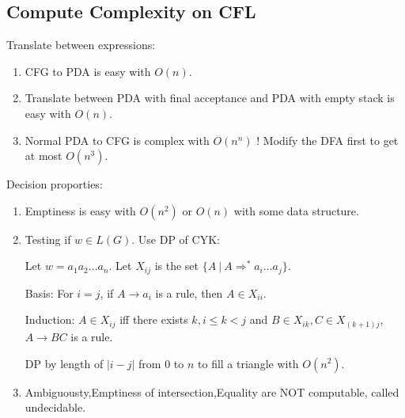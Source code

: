     \subsection{Compute Complexity on CFL}   
    Translate between expressions:
    \begin{enumerate}
        \item CFG to PDA is easy with $O\left( n \right) $.
        \item Translate between PDA with final acceptance and PDA with empty stack is easy with $O\left( n \right) $.
        \item Normal PDA to CFG is complex with $O\left( n^{n} \right) $ ! Modify the DFA first to get at most $O\left( n^3 \right) $.
    \end{enumerate}
    Decision proporties:
    \begin{enumerate}
        \item Emptiness is easy with $O\left( n^2 \right) $ or $O\left( n \right) $ with some data structure.
        \item Testing if $w\in L\left( G \right) $. Use DP of CYK:

            Let $w=a_1a_2\ldots a_{n}$. Let $X_{ij}$ is the set $\{A\ |\ A\Rightarrow ^{*}a_{i}\ldots a_{j}\}$.

            Basis: For $i=j$, if $A\rightarrow a_{i}$ is a rule, then $A\in X_{ii}$.

            Induction: $A\in X_{ij}$ iff there exists $k,i\le k<j$ and $B\in X_{ik},C\in X_{\left( k+1 \right) j}$, $A\rightarrow BC$ is a rule.

            DP by length of $|i-j|$ from $0$ to $n$ to fill a triangle with $O\left( n^2 \right) $.
        \item Ambiguousty,Emptiness of intersection,Equality are NOT computable, called undecidable.
    \end{enumerate}

